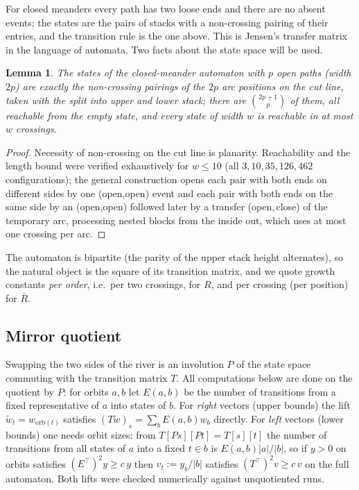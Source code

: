 \documentclass[11pt]{amsart}
\newtheorem{lemma}[theorem]{Lemma}
\theoremstyle{definition}
\newcommand{\Rb}{\bar R}
\newcommand{\ttop}{^{\!\top}}
\begin{document}
For closed meanders every path has two loose ends and there are no absent events; the states are the pairs of stacks with a non-crossing pairing of their entries, and the transition rule is the one above. This is Jensen's transfer matrix \cite{Jensen2000} in the language of automata. Two facts about the state space will be used.

\begin{lemma}\label{lem:states}
The states of the closed-meander automaton with $p$ open paths (width $2p$) are exactly the non-crossing pairings of the $2p$ arc positions on the cut line, taken with the split into upper and lower stack; there are $\binom{2p+1}{p}$ of them, all reachable from the empty state, and every state of width $w$ is reachable in at most $w$ crossings.
\end{lemma}

\begin{proof}
Necessity of non-crossing on the cut line is planarity. Reachability and the length bound were verified exhaustively for $w\le10$ (all $3,10,35,126,462$ configurations); the general construction opens each pair with both ends on different sides by one (open,open) event and each pair with both ends on the same side by an (open,open) followed later by a transfer (open,\,close) of the temporary arc, processing nested blocks from the inside out, which uses at most one crossing per arc.
\end{proof}

The automaton is bipartite (the parity of the upper stack height alternates), so the natural object is the square of its transition matrix, and we quote growth constants \emph{per order}, i.e.\ per two crossings, for $R$, and per crossing (per position) for $\Rb$.

\subsection{Mirror quotient}
Swapping the two sides of the river is an involution $P$ of the state space commuting with the transition matrix $T$. All computations below are done on the quotient by $P$: for orbits $a,b$ let $E(a,b)$ be the number of transitions from a fixed representative of $a$ into states of $b$. For \emph{right} vectors (upper bounds) the lift $\tilde w_t=w_{\mathrm{orb}(t)}$ satisfies $(T\tilde w)_s=\sum_bE(a,b)w_b$ directly. For \emph{left} vectors (lower bounds) one needs orbit sizes: from $T[Ps][Pt]=T[s][t]$ the number of transitions from all states of $a$ into a fixed $t\in b$ is $E(a,b)|a|/|b|$, so if $y>0$ on orbits satisfies $(E\ttop)^2y\ge c\,y$ then $v_t:=y_b/|b|$ satisfies $(T\ttop)^2v\ge c\,v$ on the full automaton. Both lifts were checked numerically against unquotiented runs.
\end{document}
